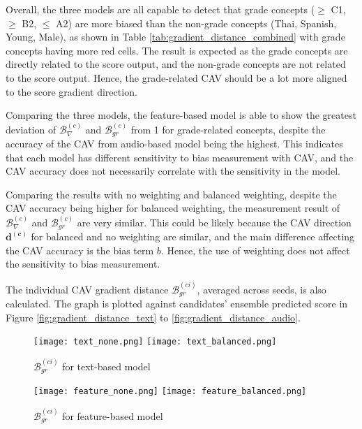 Overall, the three models are all capable to detect that grade concepts ($\geq$ C1, $\geq$ B2, $\leq$ A2) are more biased than the non-grade concepts (Thai, Spanish, Young, Male), as shown in Table \ref{tab:gradient_distance_combined} with grade concepts having more red cells. The result is expected as the grade concepts are directly related to the score output, and the non-grade concepts are not related to the score output. Hence, the grade-related CAV should be a lot more aligned to the score gradient direction.

Comparing the three models, the feature-based model is able to show the greatest deviation of $\mathcal{B}^{(c)}_{\nabla}$ and $\mathcal{B}^{(c)}_{gr}$ from 1 for grade-related concepts, despite the accuracy of the CAV from audio-based model being the highest. This indicates that each model has different sensitivity to bias measurement with CAV, and the CAV accuracy does not necessarily correlate with the sensitivity in the model.

Comparing the results with no weighting and balanced weighting, despite the CAV accuracy being higher for balanced weighting, the measurement result of $\mathcal{B}^{(c)}_{\nabla}$ and $\mathcal{B}^{(c)}_{gr}$ are very similar. This could be likely because the CAV direction $\boldsymbol{d^{(c)}}$ for balanced and no weighting are similar, and the main difference affecting the CAV accuracy is the bias term $b$. Hence, the use of weighting does not affect the sensitivity to bias measurement.

The individual CAV gradient distance $\mathcal{B}^{(ci)}_{gr}$, averaged across seeds, is also calculated. The graph is plotted against candidates’ ensemble predicted score in Figure \ref{fig:gradient_distance_text} to \ref{fig:gradient_distance_audio}.

\begin{figure}[H]
    \centering
    \begin{minipage}[t]{0.48\textwidth}
        \centering
        \texttt{[image: text\_none.png]}
        \hfill
        \texttt{[image: text\_balanced.png]}
        \caption{$\mathcal{B}^{(ci)}_{gr}$ for text-based model}
        \label{fig:gradient_distance_text}
    \end{minipage}
    \hfill
    \begin{minipage}[t]{0.48\textwidth}
        \centering
        \texttt{[image: feature\_none.png]}
        \hfill
        \texttt{[image: feature\_balanced.png]}
        \caption{$\mathcal{B}^{(ci)}_{gr}$ for feature-based model}
        \label{fig:gradient_distance_feature}
    \end{minipage}
\end{figure}

